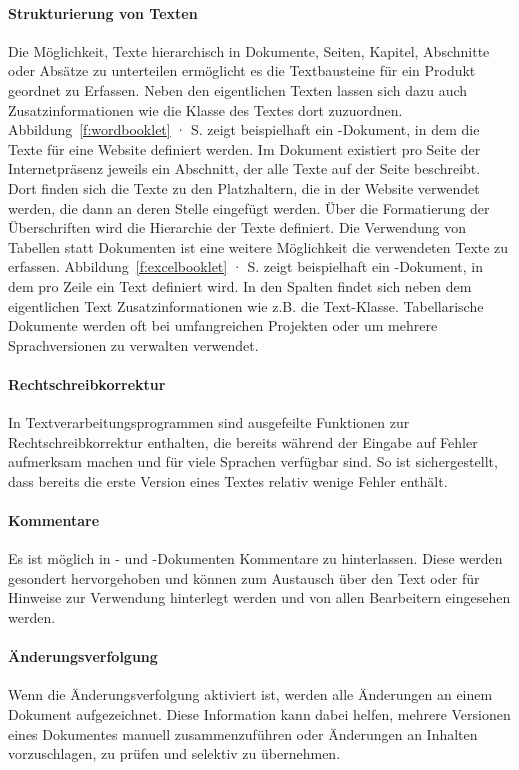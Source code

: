 \paragraph{Strukturierung von Texten} Die Möglichkeit, Texte hierarchisch in Dokumente, Seiten, Kapitel, Abschnitte oder Absätze zu unterteilen ermöglicht es die Textbausteine für ein Produkt geordnet zu Erfassen. Neben den eigentlichen Texten lassen sich dazu auch Zusatzinformationen wie die Klasse des Textes dort zuzuordnen. Abbildung~\ref{f:wordbooklet} · S.\pageref{f:wordbooklet} zeigt beispielhaft ein -Dokument, in dem die Texte für eine Website definiert werden. Im Dokument existiert pro Seite der Internetpräsenz jeweils ein Abschnitt, der alle Texte auf der Seite beschreibt. Dort finden sich die Texte zu den Platzhaltern, die in der Website verwendet werden, die dann an deren Stelle eingefügt werden. Über die Formatierung der Überschriften wird die Hierarchie der Texte definiert. Die Verwendung von Tabellen statt Dokumenten ist eine weitere Möglichkeit die verwendeten Texte zu erfassen. Abbildung~\ref{f:excelbooklet} · S.\pageref{f:excelbooklet} zeigt beispielhaft ein -Dokument, in dem pro Zeile ein Text definiert wird. In den Spalten findet sich neben dem eigentlichen Text Zusatzinformationen wie z.B. die Text-Klasse. Tabellarische Dokumente werden oft bei umfangreichen Projekten oder um mehrere Sprachversionen zu verwalten verwendet.

\paragraph{Rechtschreibkorrektur} In Textverarbeitungsprogrammen sind ausgefeilte Funktionen zur Rechtschreibkorrektur enthalten, die bereits während der Eingabe auf Fehler aufmerksam machen und für viele Sprachen verfügbar sind. So ist sichergestellt, dass bereits die erste Version eines Textes relativ wenige Fehler enthält.

\paragraph{Kommentare} Es ist möglich in - und -Dokumenten Kommentare zu hinterlassen. Diese werden gesondert hervorgehoben und können zum Austausch über den Text oder für Hinweise zur Verwendung hinterlegt werden und von allen Bearbeitern eingesehen werden.

\paragraph{Änderungsverfolgung} Wenn die Änderungsverfolgung aktiviert ist, werden alle Änderungen an einem Dokument aufgezeichnet. Diese Information kann dabei helfen, mehrere Versionen eines Dokumentes manuell zusammenzuführen oder Änderungen an Inhalten vorzuschlagen, zu prüfen und selektiv zu übernehmen.

